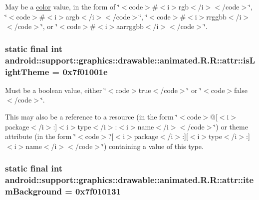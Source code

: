 May be a \hyperlink{classandroid_1_1support_1_1graphics_1_1drawable_1_1animated_1_1_r_1_1color}{color} value, in the form of \char`\"{}$<$code$>$\#$<$i$>$rgb$<$/i$>$$<$/code$>$\char`\"{}, \char`\"{}$<$code$>$\#$<$i$>$argb$<$/i$>$$<$/code$>$\char`\"{}, \char`\"{}$<$code$>$\#$<$i$>$rrggbb$<$/i$>$$<$/code$>$\char`\"{}, or \char`\"{}$<$code$>$\#$<$i$>$aarrggbb$<$/i$>$$<$/code$>$\char`\"{}. \hypertarget{classandroid_1_1support_1_1graphics_1_1drawable_1_1animated_1_1_r_1_1attr_d40ca602c68846dc4d97a5ef5fc64809}{
\subsubsection[{isLightTheme}]{\setlength{\rightskip}{0pt plus 5cm}static final int android::support::graphics::drawable::animated.R.R::attr::isLightTheme = 0x7f01001e}}
\label{classandroid_1_1support_1_1graphics_1_1drawable_1_1animated_1_1_r_1_1attr_d40ca602c68846dc4d97a5ef5fc64809}


Must be a boolean value, either \char`\"{}$<$code$>$true$<$/code$>$\char`\"{} or \char`\"{}$<$code$>$false$<$/code$>$\char`\"{}. 

This may also be a reference to a resource (in the form \char`\"{}$<$code$>$@\mbox{[}$<$i$>$package$<$/i$>$:\mbox{]}$<$i$>$type$<$/i$>$:$<$i$>$name$<$/i$>$$<$/code$>$\char`\"{}) or theme attribute (in the form \char`\"{}$<$code$>$?\mbox{[}$<$i$>$package$<$/i$>$:\mbox{]}\mbox{[}$<$i$>$type$<$/i$>$:\mbox{]}$<$i$>$name$<$/i$>$$<$/code$>$\char`\"{}) containing a value of this type. \hypertarget{classandroid_1_1support_1_1graphics_1_1drawable_1_1animated_1_1_r_1_1attr_1e81f1ba6d72b247099c7d265023f039}{
\subsubsection[{itemBackground}]{\setlength{\rightskip}{0pt plus 5cm}static final int android::support::graphics::drawable::animated.R.R::attr::itemBackground = 0x7f010131}}
\label{classandroid_1_1support_1_1graphics_1_1drawable_1_1animated_1_1_r_1_1attr_1e81f1ba6d72b247099c7d265023f039}


